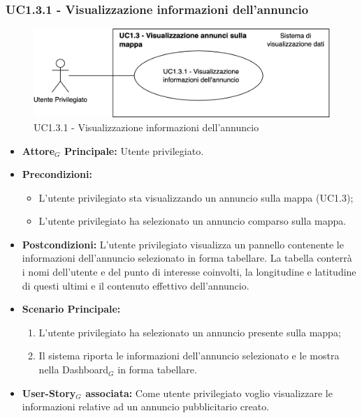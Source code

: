 \documentclass[11pt]{article}
\begin{document}
\begin{justify}
\subsubsection{\textbf{UC1.3.1 - Visualizzazione informazioni dell'annuncio}}
\begin{figure}[H]
    \centering
    \includegraphics[width=0.7\linewidth]{UC1.3.1image.png}
    \caption{UC1.3.1 - Visualizzazione informazioni dell'annuncio}
    \label{fig:UC1.3.1}
\end{figure}
\label{UC1.3.1}
\begin{itemize}
    \item \textbf{Attore$_G$ Principale:} Utente privilegiato.
    \item \textbf{Precondizioni:} 
        \begin{itemize}
          \item L'utente privilegiato sta visualizzando un annuncio sulla mappa (UC1.3);
    	\item L'utente privilegiato ha selezionato un annuncio comparso sulla mappa.
        \end{itemize}
    \item \textbf{Postcondizioni:} L'utente privilegiato visualizza un pannello contenente le informazioni dell'annuncio selezionato in forma tabellare. La tabella conterrà i nomi dell'utente e del punto di interesse coinvolti, la longitudine e latitudine di questi ultimi e il contenuto effettivo dell'annuncio.
    \item \textbf{Scenario Principale:} 
        \begin{enumerate}
          \item L'utente privilegiato ha selezionato un annuncio presente sulla mappa;
            \item Il sistema riporta le informazioni dell'annuncio selezionato e le mostra nella Dashboard$_G$ in forma tabellare.
	\end{enumerate}
    \item \textbf{User-Story$_G$ associata:} Come utente privilegiato voglio visualizzare le informazioni relative ad un annuncio pubblicitario creato.
\end{itemize}


\end{justify}
\end{document}
